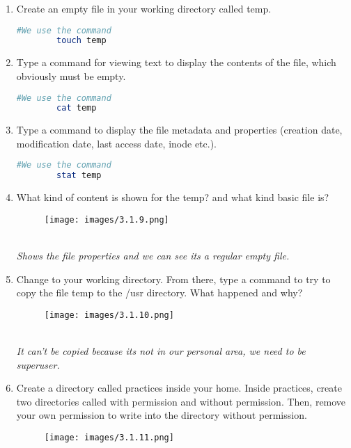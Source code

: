 \documentclass[12pt, titlepage,]{article}
\begin{document}
\begin{enumerate}
\item Create an empty file in your working directory called temp.
    \begin{lstlisting}[language=Bash]    
        #We use the command
        touch temp
        \end{lstlisting}


\item  Type a command for viewing text to display the contents of the file, which obviously must be empty.
\begin{lstlisting}[language=Bash]    
        #We use the command
        cat temp
        \end{lstlisting}

\item  Type a command to display the file metadata and properties (creation date, modification date, last access date, inode etc.).
\begin{lstlisting}[language=Bash]    
        #We use the command
        stat temp
        \end{lstlisting}

\item  What kind of content is shown for the temp? and what kind basic file is?
\begin{figure}[h] %
    \centering
    \texttt{[image: images/3.1.9.png]}
\end{figure}
\\
\textit{\color{blue} Shows the file properties and we can see its a regular empty file.}

\item  Change to your working directory. From there, type a command to try to copy the file temp to the /usr directory.
What happened and why?
\begin{figure}[h] %
    \centering
    \texttt{[image: images/3.1.10.png]}
\end{figure}
\\
\textit{\color{blue} It can't be copied because its not in our personal area, we need to be superuser.}

\item  Create a directory called practices inside your home. Inside practices, create two directories called with permission and  without permission. Then, remove your own permission to write into the directory without permission.
\begin{figure}[h] %
    \centering
    \texttt{[image: images/3.1.11.png]}
\end{figure}
\clearpage


\end{enumerate}
\end{document}
